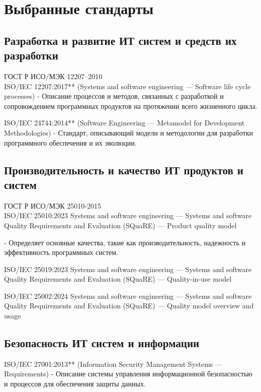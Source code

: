 \section{Выбранные стандарты}

\subsection{Разработка и развитие ИТ систем и средств их разработки}

ГОСТ Р ИСО/МЭК 12207--2010\\
ISO/IEC 12207:2017** (Systems and software engineering — Software life cycle processes)
     - Описание процессов и методов, связанных с разработкой и сопровождением программных продуктов на протяжении всего жизненного цикла.

ISO/IEC 24744:2014** (Software Engineering — Metamodel for Development Methodologies)
     - Стандарт, описывающий модели и методологии для разработки программного обеспечения и их эволюции.

\subsection{Производительность и качество ИТ продуктов и систем}
ГОСТ Р ИСО/МЭК 25010-2015\\
ISO/IEC 25010:2023 Systems and software engineering — Systems and software Quality Requirements and Evaluation (SQuaRE) — Product quality model

     - Определяет основные качества, такие как производительность, надежность и эффективность программных систем.


ISO/IEC 25019:2023
Systems and software engineering — Systems and software Quality Requirements and Evaluation (SQuaRE) — Quality-in-use model

ISO/IEC 25002:2024
Systems and software engineering — Systems and software Quality Requirements and Evaluation (SQuaRE) — Quality model overview and usage

\subsection{Безопасность ИТ систем и информации}

ISO/IEC 27001:2013** (Information Security Management Systems — Requirements)
     - Описание системы управления информационной безопасностью и процессов для обеспечения защиты данных.

